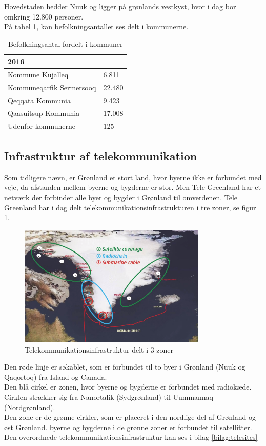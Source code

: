 Hovedstaden hedder Nuuk og ligger på grønlands vestkyst, hvor i dag bor omkring 12.800 personer.\\
På tabel \ref{tab:befolkning}, kan befolkningsantallet ses delt i kommunerne.
\newpage
\begin{table}[h]
\centering
    \begin{tabular}{|l|l|}
    \hline
    2016                     & ~      \\ \hline
    Kommune Kujalleq         & 6.811  \\ \hline
    Kommuneqarfik Sermersooq & 22.480 \\ \hline
    Qeqqata Kommunia         & 9.423  \\ \hline
    Qaasuitsup Kommunia      & 17.008 \\ \hline
    Udenfor kommunerne       & 125    \\ \hline
    \end{tabular}
    \caption{Befolkningsantal fordelt i kommuner}
    \label{tab:befolkning}
\end{table}

\subsection{Infrastruktur af telekommunikation}
Som tidligere nævn, er Grønland et stort land, hvor byerne ikke er forbundet med veje, da afstanden mellem byerne og bygderne er stor. Men Tele Greenland har et netværk der forbinder alle byer og bygder i Grønland til omverdenen. Tele Greenland har i dag delt telekommunikationsinfrastrukturen i tre zoner, se figur \ref{fig:zoner}.\\
\begin{figure}[h]
	\centering
	\includegraphics[width=0.8\textwidth]{figure/zoner.PNG}
	\caption{Telekommunikationsinfrastruktur delt i 3 zoner}
	\label{fig:zoner}
\end{figure} 
Den røde linje er søkablet, som er forbundet til to byer i Grønland (Nuuk og Qaqortoq) fra Island og Canada.\\
Den blå cirkel er zonen, hvor byerne og bygderne er forbundet med radiokæde. Cirklen strækker sig fra Nanortalik (Sydgrønland) til Uummannaq (Nordgrønland).\\
Den zone er de grønne cirkler, som er placeret i den nordlige del af Grønland og øst Grønland. byerne og bygderne i de grønne zoner er forbundet til satellitter.\\ 
Den overordnede telekommunikationsinfrastruktur kan ses i bilag \ref{bilag:telesites}

